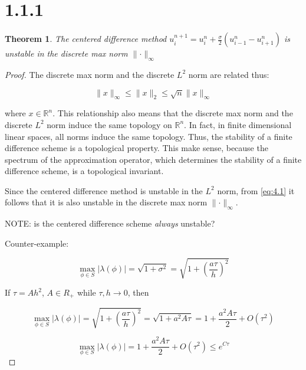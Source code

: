 \documentclass[a4paper]{amsproc}
\theoremstyle{plain}
\newtheorem*{thm}{Theorem}
\theoremstyle{definition}
\theoremstyle{remark}
\numberwithin{equation}{section}
\renewcommand{\le}{\leqslant}\renewcommand{\leq}{\leqslant}
\providecommand{\norm}[1]{\lVert#1 \rVert}
\begin{document}
\section*{1.1.1}

\begin{thm} \label{some label}
The centered difference method $u^{n+1}_i = u^{n}_i+\frac{\sigma}{2}(u^{n}_{i-1}-u^{n}_{i+1}) $ is unstable in the discrete max norm $\norm{\cdot}_{\infty}$  
\end{thm}

\begin{proof}

The discrete max norm and the discrete $L^2$ norm are related thus:

\begin{equation}\label{eq:4.1}
 \norm{x}_{\infty} \le \norm{x}_{2} \le \sqrt{n}\norm{x}_{\infty}  
\end{equation}

where $x \in \mathbb{R}^n$. This relationship also means that the discrete max norm and the discrete $L^2$ norm induce the same topology on $\mathbb{R}^n$. In fact, in finite dimensional linear spaces, all norms induce the same topology. Thus, the stability of a finite difference scheme is a topological property. This make sense, because the spectrum of the approximation operator, which determines the stability of a finite difference scheme, is a topological invariant.

Since the centered difference method is unstable in the $L^2$ norm, from \eqref{eq:4.1} it follows that it is also unstable in the discrete max norm $\norm{\cdot}_{\infty}$.

NOTE: is the centered difference scheme \emph{always} unstable? 

Counter-example:

\begin{equation}\label{eq:4.2}
\underset{\phi \in S}{\max} \lvert \lambda(\phi) \rvert = \sqrt{1+\sigma^2} = \sqrt{1+(\frac{a\tau}{h})^2} 
\end{equation}

If $\tau = Ah^2$, $A \in R_+$ while $\tau, h \rightarrow 0$, then

\begin{equation}\label{eq:4.3} 
\underset{\phi \in S}{\max} \lvert \lambda(\phi) \rvert = \sqrt{1+(\frac{a\tau}{h})^2} = \sqrt{1+a^2A\tau} = 1 + \frac{a^2A\tau}{2} + O(\tau^2) \end{equation}

\begin{equation}\label{eq:4.4} 
\underset{\phi \in S}{\max} \lvert \lambda(\phi) \rvert = 1 + \frac{a^2A\tau}{2} + O(\tau^2) \le e^{C\tau}
\end{equation}


\end{proof}
\end{document}
